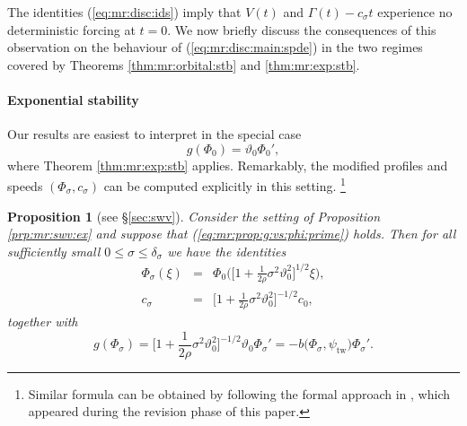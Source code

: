\documentclass[10pt]{articleHJ}
\newcommand{\sref}[1]{(\ref{#1})}                       %
\newtheorem{prop}[thm]{Proposition}
\numberwithin{equation}{section}
\begin{document}
The identities \sref{eq:mr:disc:ids}
imply that $V(t)$ and $\Gamma(t) - c_{\sigma} t$
experience no deterministic forcing at
$t = 0$. We now briefly discuss
the consequences of this observation
on the behaviour of \sref{eq:mr:disc:main:spde}
in the two regimes
covered by Theorems \ref{thm:mr:orbital:stb} and
\ref{thm:mr:exp:stb}.











\paragraph{Exponential stability}
Our results are easiest to interpret
in the special case
\begin{equation}
g(\Phi_0) = \vartheta_0 \Phi_0',
\end{equation}
where Theorem \ref{thm:mr:exp:stb} applies.
Remarkably, the modified profiles and speeds
$(\Phi_{\sigma} , c_{\sigma})$
can be computed explicitly in this setting. \footnote{ Similar formula can be obtained by following the formal approach in \cite{Cartwright2019}, which appeared during the revision phase of this paper.}


\begin{prop}[{see \S\ref{sec:swv}}]
\label{prp:mr:expl:waves}
Consider the setting of Proposition \ref{prp:mr:swv:ex}
and suppose that \sref{eq:mr:prop:g:vs:phi:prime} holds. Then for all sufficiently small $0 \le \sigma \le \delta_{\sigma}$
we have the identities
\begin{equation}
\label{eq:mr:id:for:mod:wave:exp:stb}
\begin{array}{lcl}
   \Phi_{\sigma}(\xi)
  & = & \Phi_0\Big(
    \big[ 1 + \frac{1}{2\rho} \sigma^2 \vartheta_{0}^2 \big]^{1/2}
      \xi \Big) ,
\\[0.2cm]
  c_{\sigma} & = &
    \big[ 1 + \frac{1}{2\rho} \sigma^2 \vartheta_{0}^2 \big]^{-1/2}
       c_0 ,
\end{array}
\end{equation}
together with
\begin{equation}
\label{eq:mr:id:for:g:expl:case}
g(\Phi_{\sigma} ) =
 \big[ 1 + \frac{1}{2\rho} \sigma^2 \vartheta_{0}^2 \big]^{-1/2}
   \vartheta_0 \Phi_{\sigma}'
 = -b\big( \Phi_{\sigma}, \psi_{\mathrm{tw} } \big)
 \Phi_{\sigma}'.
\end{equation}
\end{prop}
\end{document}

